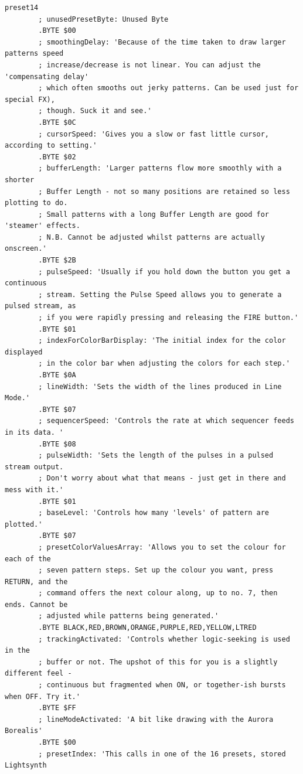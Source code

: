 \begin{lstlisting}[basicstyle=\ttfamily\tiny,caption=Source code for Preset 14.]
preset14
        ; unusedPresetByte: Unused Byte
        .BYTE $00
        ; smoothingDelay: 'Because of the time taken to draw larger patterns speed
        ; increase/decrease is not linear. You can adjust the 'compensating delay'
        ; which often smooths out jerky patterns. Can be used just for special FX),
        ; though. Suck it and see.'
        .BYTE $0C
        ; cursorSpeed: 'Gives you a slow or fast little cursor, according to setting.'
        .BYTE $02
        ; bufferLength: 'Larger patterns flow more smoothly with a shorter
        ; Buffer Length - not so many positions are retained so less plotting to do.
        ; Small patterns with a long Buffer Length are good for 'steamer' effects.
        ; N.B. Cannot be adjusted whilst patterns are actually onscreen.'
        .BYTE $2B
        ; pulseSpeed: 'Usually if you hold down the button you get a continuous
        ; stream. Setting the Pulse Speed allows you to generate a pulsed stream, as
        ; if you were rapidly pressing and releasing the FIRE button.'
        .BYTE $01
        ; indexForColorBarDisplay: 'The initial index for the color displayed
        ; in the color bar when adjusting the colors for each step.'
        .BYTE $0A
        ; lineWidth: 'Sets the width of the lines produced in Line Mode.'
        .BYTE $07
        ; sequencerSpeed: 'Controls the rate at which sequencer feeds in its data. '
        .BYTE $08
        ; pulseWidth: 'Sets the length of the pulses in a pulsed stream output.
        ; Don't worry about what that means - just get in there and mess with it.'
        .BYTE $01
        ; baseLevel: 'Controls how many 'levels' of pattern are plotted.'
        .BYTE $07
        ; presetColorValuesArray: 'Allows you to set the colour for each of the
        ; seven pattern steps. Set up the colour you want, press RETURN, and the
        ; command offers the next colour along, up to no. 7, then ends. Cannot be
        ; adjusted while patterns being generated.'
        .BYTE BLACK,RED,BROWN,ORANGE,PURPLE,RED,YELLOW,LTRED
        ; trackingActivated: 'Controls whether logic-seeking is used in the
        ; buffer or not. The upshot of this for you is a slightly different feel -
        ; continuous but fragmented when ON, or together-ish bursts when OFF. Try it.'
        .BYTE $FF
        ; lineModeActivated: 'A bit like drawing with the Aurora Borealis'
        .BYTE $00
        ; presetIndex: 'This calls in one of the 16 presets, stored Lightsynth

\end{lstlisting}
